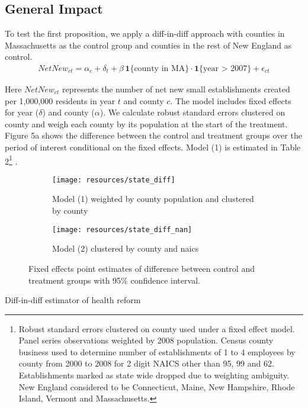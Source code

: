 \documentclass[12pt]{article}
\begin{document}
\subsection{General Impact}

To test the first proposition, we apply a diff-in-diff approach with counties in Massachusetts as the control group and counties in the rest of New England as control.
\begin{align}
NetNew_{ct} = \alpha_c + \delta_t + \beta \, \mathbf{1}\{\text{county in MA}\} \cdot \mathbf{1}\{\text{year > 2007}\} + \epsilon_{ct}
\end{align}

Here $NetNew_{ct}$ represents the number of net new small establishments created per 1,000,000 residents in year $t$ and county $c$. The model includes fixed effects for year ($\delta$) and county ($\alpha$). We calculate robust standard errors clustered on county and weigh each county by its population at the start of the treatment. Figure 5a shows the difference between the control and treatment groups over the period of interest conditional on the fixed effects. Model (1) is estimated in Table 2\footnote{Robust standard errors clustered on county used under a fixed effect model. Panel series observations weighted by 2008 population. Census county business used to determine number of establishments of 1 to 4 employees by county from 2000 to 2008 for 2 digit NAICS other than 95, 99 and 62. Establishments marked as state wide dropped due to weighting ambiguity. New England considered to be Connecticut, Maine, New Hampshire, Rhode Island, Vermont and Massachusetts. } . 

\begin{figure}[H]
	\centering
	\begin{subfigure}[b]{0.495\textwidth}
	    \texttt{[image: resources/state\_diff]}
	    \caption{Model (1) weighted by county population and clustered by county}
	\end{subfigure}
	\begin{subfigure}[b]{0.495\textwidth}
		  \texttt{[image: resources/state\_diff\_nan]}
		  \caption{Model (2) clustered by county and naics}
	\end{subfigure}
	\caption{Fixed effects point estimates of difference between control and treatment groups with 95\% confidence interval.}
\end{figure}

\begin{center}
	\begin{table}[H]		
		\centering
			
		\caption{Diff-in-diff estimator of health reform} 
	\end{table}
\end{center}
\end{document}

